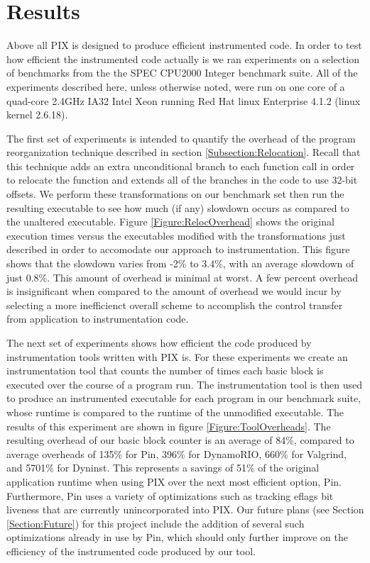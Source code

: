 \section{Results}

Above all PIX is designed to produce efficient instrumented code. In order to test how efficient the
instrumented code actually is we ran experiments on a selection of benchmarks from the the SPEC CPU2000
Integer benchmark suite. All of the experiments described here, unless otherwise noted, were run on
one core of a quad-core 2.4GHz IA32 Intel Xeon running Red Hat linux Enterprise 4.1.2 (linux kernel 2.6.18).

The first set of experiments is intended to quantify the overhead of the program reorganization technique 
described in section \ref{Subsection:Relocation}. Recall that this technique adds an extra unconditional
branch to each function call in order to relocate the function and extends all of the branches in the code
to use 32-bit offsets. We perform these transformations on our benchmark set then run the resulting executable
to see how much (if any) slowdown occurs as compared to the unaltered executable. Figure \ref{Figure:RelocOverhead} shows
the original execution times versus the executables modified with the transformations just described in order to
accomodate our approach to instrumentation. This figure shows that the slowdown varies from -2\% to 3.4\%, with an
average slowdown of just 0.8\%. This amount of overhead is minimal at worst. A few percent overhead is
insignificant when compared to the amount of overhead we would incur by selecting a more inefficienct overall
scheme to accomplish the control transfer from application to instrumentation code.

The next set of experiments shows how efficient the code produced by instrumentation tools written with PIX is.
For these experiments we create an instrumentation tool that counts the number of times each basic block is
executed over the course of a program run. The instrumentation tool is then used to produce an instrumented
executable for each program in our benchmark suite, whose runtime is compared to the runtime of the 
unmodified executable. The results of this experiment are shown in figure \ref{Figure:ToolOverheads}. The
resulting overhead of our basic block counter is an average of 84\%, compared to average overheads of
135\% for Pin, 396\% for DynamoRIO, 660\% for Valgrind, and 5701\% for Dyninst. This represents a savings of
51\% of the original application runtime when using PIX over the next most efficient option, Pin. Furthermore,
Pin uses a variety of optimizations such as tracking eflags bit liveness \cite{luk2005pin} that are currently
unincorporated into PIX. Our future plans (see Section \ref{Section:Future}) for this project include the addition of several
such optimizations already in use by Pin, which should only further improve on the efficiency of the instrumented
code produced by our tool.
